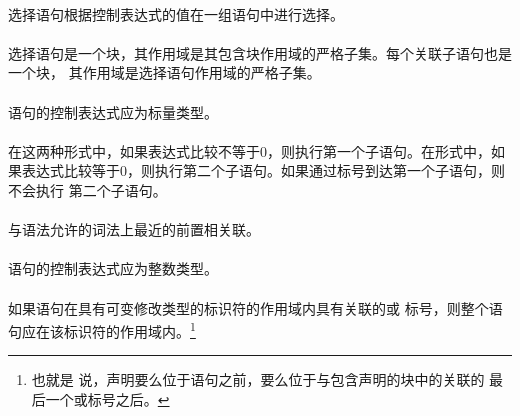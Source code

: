 
\syntax
\paragraph{}

\semantic
\paragraph{}
选择语句根据控制表达式的值在一组语句中进行选择。

\paragraph{}
选择语句是一个块，其作用域是其包含块作用域的严格子集。每个关联子语句也是一个块，
其作用域是选择语句作用域的严格子集。

\constraint
\paragraph{}
语句的控制表达式应为标量类型。

\semantic
\paragraph{}
在这两种形式中，如果表达式比较不等于0，则执行第一个子语句。在形式中，如
果表达式比较等于0，则执行第二个子语句。如果通过标号到达第一个子语句，则不会执行
第二个子语句。

\paragraph{}
与语法允许的词法上最近的前置相关联。

\constraint
\paragraph{}
语句的控制表达式应为整数类型。

\paragraph{}
如果语句在具有可变修改类型的标识符的作用域内具有关联的或
标号，则整个语句应在该标识符的作用域内。\footnote{也就是
说，声明要么位于语句之前，要么位于与包含声明的块中的关联的
最后一个或标号之后。}

